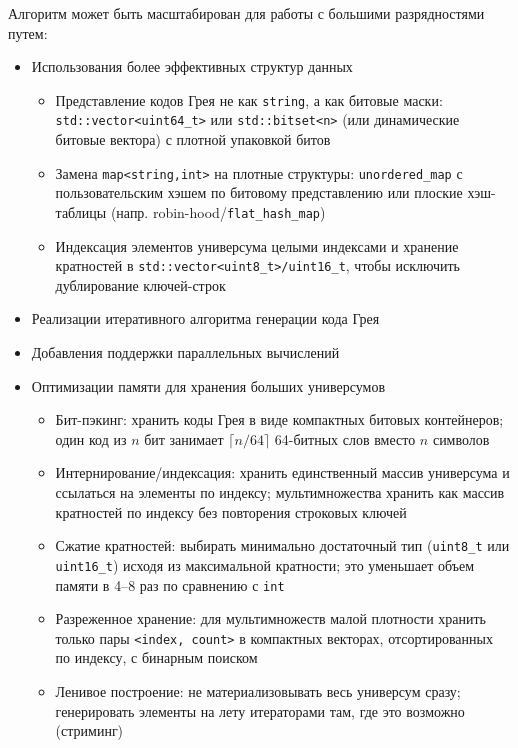 \documentclass[12pt,a4paper]{article}
\begin{document}
Алгоритм может быть масштабирован для работы с большими разрядностями путем:
\begin{itemize}
    \item Использования более эффективных структур данных
    \begin{itemize}
        \item Представление кодов Грея не как \texttt{string}, а как битовые маски: \texttt{std::vector<uint64\_t>} или \texttt{std::bitset<n>} (или динамические битовые вектора) с плотной упаковкой битов
        \item Замена \texttt{map<string,int>} на плотные структуры: \texttt{unordered\_map} с пользовательским хэшем по битовому представлению или плоские хэш-таблицы (напр. robin-hood/\texttt{flat\_hash\_map})
        \item Индексация элементов универсума целыми индексами и хранение кратностей в \texttt{std::vector<uint8\_t>/uint16\_t}, чтобы исключить дублирование ключей-строк
    \end{itemize}
    \item Реализации итеративного алгоритма генерации кода Грея
    \item Добавления поддержки параллельных вычислений
    \item Оптимизации памяти для хранения больших универсумов
    \begin{itemize}
        \item Бит-пэкинг: хранить коды Грея в виде компактных битовых контейнеров; один код из $n$ бит занимает $\lceil n/64 \rceil$ 64-битных слов вместо $n$ символов
        \item Интернирование/индексация: хранить единственный массив универсума и ссылаться на элементы по индексу; мультимножества хранить как массив кратностей по индексу без повторения строковых ключей
        \item Сжатие кратностей: выбирать минимально достаточный тип (\texttt{uint8\_t} или \texttt{uint16\_t}) исходя из максимальной кратности; это уменьшает объем памяти в 4–8 раз по сравнению с \texttt{int}
        \item Разреженное хранение: для мультимножеств малой плотности хранить только пары \texttt{<index, count>} в компактных векторах, отсортированных по индексу, с бинарным поиском
        \item Ленивое построение: не материализовывать весь универсум сразу; генерировать элементы на лету итераторами там, где это возможно (стриминг)
    \end{itemize}
\end{itemize}
\end{document}
